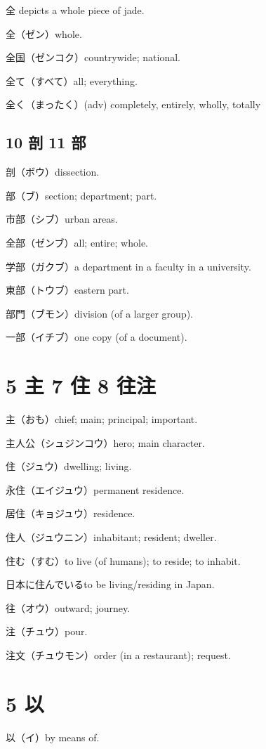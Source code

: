 全 depicts a whole piece of jade.

全（ゼン）whole.

全国（ゼンコク）countrywide; national.

全て（すべて）all; everything.

全く（まったく）(adv) completely, entirely, wholly, totally

\subsection{10 剖 11 部}

剖（ボウ）dissection.

部（ブ）section; department; part.

市部（シブ）urban areas.

全部（ゼンブ）all; entire; whole.

学部（ガクブ）a department in a faculty in a university.

東部（トウブ）eastern part.

部門（ブモン）division (of a larger group).

一部（イチブ）one copy (of a document).

\section{5 主 7 住 8 往注}

主（おも）chief; main; principal; important.

主人公（シュジンコウ）hero; main character.

住（ジュウ）dwelling; living.

永住（エイジュウ）permanent residence.

居住（キョジュウ）residence.

住人（ジュウニン）inhabitant; resident; dweller.

住む（すむ）to live (of humans); to reside; to inhabit.

日本に住んでいるto be living/residing in Japan.

往（オウ）outward; journey.

注（チュウ）pour.

注文（チュウモン）order (in a restaurant); request.

\section{5 以}

以（イ）by means of.

